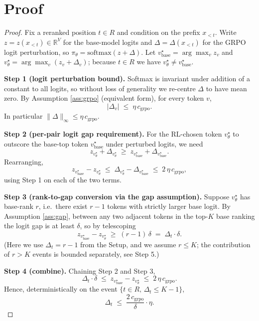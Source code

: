 \documentclass[11pt]{article}
\begin{document}
\section*{Proof}

\begin{proof}
Fix a reranked position $t \in R$ and condition on the prefix $x_{<t}$.
Write $z = z(x_{<t}) \in \mathbb{R}^V$ for the base-model logits and
$\Delta = \Delta(x_{<t})$ for the GRPO logit perturbation, so
$\pi_\theta = \mathrm{softmax}(z + \Delta)$. Let $v^\star_{\text{base}} =
\arg\max_v z_v$ and $v^\star_\theta = \arg\max_v (z_v + \Delta_v)$;
because $t \in R$ we have $v^\star_\theta \neq v^\star_{\text{base}}$.

\textbf{Step 1 (logit perturbation bound).} Softmax is invariant under
addition of a constant to all logits, so without loss of generality we
re-centre $\Delta$ to have mean zero. By Assumption \ref{ass:grpo}
(equivalent form), for every token $v$,
\[
|\Delta_v| \;\le\; \eta \, c_{\text{grpo}}.
\]
In particular $\|\Delta\|_\infty \le \eta \, c_{\text{grpo}}$.

\textbf{Step 2 (per-pair logit gap requirement).} For the RL-chosen
token $v^\star_\theta$ to outscore the base-top token $v^\star_{\text{base}}$
under perturbed logits, we need
\[
z_{v^\star_\theta} + \Delta_{v^\star_\theta} \;\ge\; z_{v^\star_{\text{base}}} + \Delta_{v^\star_{\text{base}}}.
\]
Rearranging,
\[
z_{v^\star_{\text{base}}} - z_{v^\star_\theta}
\;\le\; \Delta_{v^\star_\theta} - \Delta_{v^\star_{\text{base}}}
\;\le\; 2 \, \eta \, c_{\text{grpo}},
\]
using Step 1 on each of the two terms.

\textbf{Step 3 (rank-to-gap conversion via the gap assumption).}
Suppose $v^\star_\theta$ has base-rank $r$, i.e.\ there exist $r-1$
tokens with strictly larger base logit. By Assumption \ref{ass:gap},
between any two adjacent tokens in the top-$K$ base ranking the logit
gap is at least $\delta$, so by telescoping
\[
z_{v^\star_{\text{base}}} - z_{v^\star_\theta} \;\ge\; (r - 1) \, \delta
\;=\; \Delta_t \cdot \delta.
\]
(Here we use $\Delta_t = r - 1$ from the Setup, and we assume
$r \le K$; the contribution of $r > K$ events is bounded separately, see
Step 5.)

\textbf{Step 4 (combine).} Chaining Step 2 and Step 3,
\[
\Delta_t \cdot \delta \;\le\; z_{v^\star_{\text{base}}} - z_{v^\star_\theta}
\;\le\; 2 \, \eta \, c_{\text{grpo}}.
\]
Hence, deterministically on the event $\{t \in R, \, \Delta_t \le K-1\}$,
\[
\Delta_t \;\le\; \frac{2 \, c_{\text{grpo}}}{\delta} \cdot \eta.
\]


\end{proof}
\end{document}
